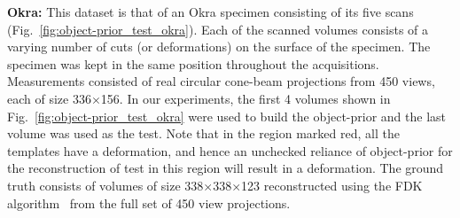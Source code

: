 \documentclass[journal]{IEEEtran}
\begin{document}
 \textbf{Okra:} This dataset is that of an Okra specimen consisting of
 its five scans (Fig.~\ref{fig:object-prior_test_okra}). Each of the
 scanned volumes consists of a varying number of cuts (or
 deformations) on the surface of the specimen. The specimen was kept
 in the same position throughout the acquisitions. Measurements
 consisted of real circular cone-beam projections from 450 views, each
 of size 336$\times$156.
In our experiments, the first 4 volumes shown in
Fig.~\ref{fig:object-prior_test_okra} were used to build the
object-prior and the last volume was used as the test. Note that in
the region marked red, all the templates have a deformation, and hence
an unchecked reliance of object-prior for the reconstruction of test
in this region will result in a deformation. The ground truth consists
of volumes of size 338$\times$338$\times$123 reconstructed using the
FDK algorithm~\cite{FDK} from the full set of
450 view projections.  
\end{document}
